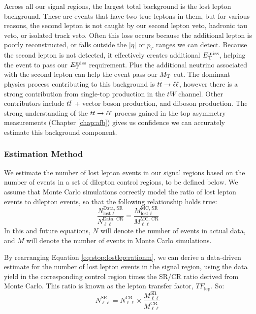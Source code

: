 Across all our signal regions, the largest total background
is the lost lepton background. These are events that have two true
leptons in them, but for various reasons, the second lepton is not
caught by our second lepton veto, hadronic tau veto, or isolated track
veto. Often this loss occurs because the additional lepton is poorly
reconstructed, or falls outside the $|\eta|$ or $p_T$ ranges we can
detect. Because the second lepton is not detected, it effectively
creates additional $E_\text{T}^\text{miss}$, helping the event to pass our $E_\text{T}^\text{miss}$
requirement. Plus the additional neutrino associated with the second
lepton can help the event pass our $M_\text{T}$ cut. The dominant physics
process contributing to this background is $t\bar{t} \rightarrow \ell\ell$, however there
is a strong contribution from single-top production in the $tW$
channel. Other contributors include $t\bar{t}$ + vector boson
production, and diboson production. The strong understanding of the
$t\bar{t} \rightarrow \ell\ell$ process gained in the top asymmetry measurements (Chapter
\ref{chap:afb}) gives us confidence we can accurately estimate this
background component.

\subsubsection{Estimation Method}
\label{sssec:stop:lostlep:estimation}

We estimate the number of lost lepton events in our signal regions
based on the number of events in a set of dilepton control regions, to be
defined below. We assume that Monte Carlo simulations correctly model
the ratio of lost lepton events to dilepton events, so that the
following relationship holds true:
\begin{equation}
\label{eq:stop:lostlep:rationm}
\frac{N_{\text{lost }\ell}^\text{Data, SR}}{N_{\ell\ell}^\text{Data, CR}} =
\frac{M_{\text{lost }\ell}^\text{MC, SR}}{M_{\ell\ell}^\text{MC, CR}}
\end{equation}
In this and future equations, $N$ will denote the number of events in
actual data, and $M$ will denote the number of events in Monte Carlo
simulations.

By rearranging Equation \ref{eq:stop:lostlep:rationm}, we can derive
a data-driven estimate for the number of lost lepton events in the
signal region, using the data yield in the corresponding control region
times the SR/CR ratio derived from Monte Carlo. This ratio is known as
the lepton transfer factor, $TF_\text{lep}$. So:
\begin{equation}
\label{eq:stop:lostlep:estimate}
N_{\ell\ell}^\text{SR} = N_{\ell\ell}^\text{CR} \times \frac{M_{\ell\ell}^\text{SR}}{M_{\ell\ell}^\text{CR}}
\end{equation}

